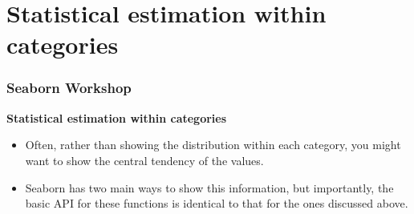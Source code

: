 \documentclass{beamer}
\begin{document}
\section{Statistical estimation within categories}

\begin{frame}[fragile]
	\frametitle{Seaborn Workshop}
	\large
\noindent \textbf{Statistical estimation within categories}
\begin{itemize}
\item Often, rather than showing the distribution within each category, you might want to show the central tendency of the values. 
\item Seaborn has two main ways to show this information, but importantly, the basic API for these functions is identical to that for the ones discussed above.
\end{itemize}
\end{frame}
\end{document}
